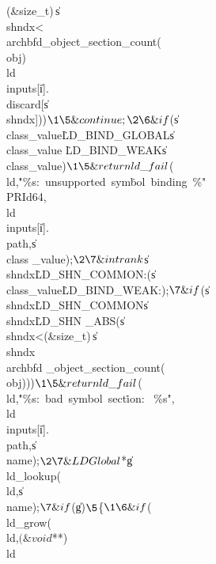 \W(\&{size\_t})\,\|s\MG\\{shndx}<\\{archbfd\_object\_section\_count}(%
\\{obj})\W\\{ld}\MG\\{inputs}[\|i].\\{discard}[\|s\MG\\{shndx}])){}$\1\5
\&{continue};\2\6
\&{if} ${}(\|s\MG\\{class\_value}\I\.{LD\_BIND\_GLOBAL}\W\|s\MG\\{class\_value}%
\I\.{LD\_BIND\_WEAK}\W\|s\MG\\{class\_value}\I{}){}$\1\5
\&{return} \\{ld\_fail}${}(\\{ld},\.{"\%s:\ unsupported\ sym}\)\.{bol\
binding\ \%"}\\{PRId64},\\{ld}\MG\\{inputs}[\|i].\\{path},\|s\MG\\{class%
\_value});{}$\2\7
\&{int} \\{rank}${}\K\|s\MG\\{shndx}\E\.{LD\_SHN\_COMMON}\?:(\|s\MG%
\\{class\_value}\E\.{LD\_BIND\_WEAK}\?\T{1}:\T{3});{}$\7
\&{if} ${}(\|s\MG\\{shndx}\I\.{LD\_SHN\_COMMON}\W\|s\MG\\{shndx}\I\.{LD\_SHN%
\_ABS}\W(\|s\MG\\{shndx}<\T{0}\V(\&{size\_t})\,\|s\MG\\{shndx}\G\\{archbfd%
\_object\_section\_count}(\\{obj}))){}$\1\5
\&{return} \\{ld\_fail}${}(\\{ld},\.{"\%s:\ bad\ symbol\ sect}\)\.{ion:\ %
\%s"},\39\\{ld}\MG\\{inputs}[\|i].\\{path},\|s\MG\\{name});{}$\2\7
\&{LDGlobal} ${}{*}\|g\K\\{ld\_lookup}(\\{ld},\39\|s\MG\\{name});{}$\7
\&{if} ${}(\R\|g){}$\5
${}\{{}$\1\6
\&{if} ${}(\R\\{ld\_grow}(\\{ld},$(\&{void} ${}{*}{*})\,{\AND}\\{ld}\MG%

